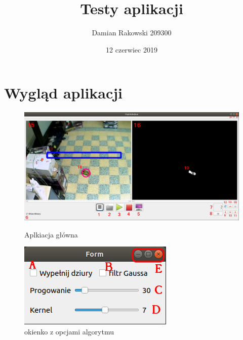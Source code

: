 \documentclass[11pt,a4paper]{article}
\title{Testy aplikacji}
\author{Damian Rakowski 209300}
\date{12 czerwiec 2019}
\begin{document}
\maketitle
\section{Wygląd aplikacji}
\begin{figure}[h]
\centering
\includegraphics[width=\textwidth]{aplikacja.png}
\caption{Aplkiacja główna}
\vspace{1.5cm}
\includegraphics[scale=1]{opcje.png}
\caption{okienko z opcjami algorytmu}
\end{figure}
\end{document}
